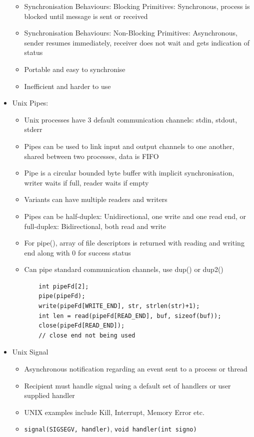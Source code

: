 \documentclass[10pt, landscape]{article}
\begin{document}
\begin{multicols*}{3}
\begin{itemize}
\begin{itemize}
        \item Synchronisation Behaviours: Blocking Primitives: Synchronous, process is blocked until message is sent or received
        \item Synchronisation Behaviours: Non-Blocking Primitives: Asynchronous, sender resumes immediately, receiver does not wait and gets indication of status
        \item Portable and easy to synchronise
        \item Inefficient and harder to use
    \end{itemize}
    \item Unix Pipes:
    \begin{itemize}
        \item Unix processes have 3 default communication channels: stdin, stdout, stderr
        \item Pipes can be used to link input and output channels to one another, shared between two processes, data is FIFO
        \item Pipe is a circular bounded byte buffer with implicit synchronisation, writer waits if full, reader waits if empty
        \item Variants can have multiple readers and writers
        \item Pipes can be half-duplex: Unidirectional, one write and one read end, or full-duplex: Bidirectional, both read and write
        \item For pipe(), array of file descriptors is returned with reading and writing end along with 0 for success status
        \item Can pipe standard communication channels, use dup() or dup2()
        \begin{verbatim}
    int pipeFd[2];
    pipe(pipeFd);
    write(pipeFd[WRITE_END], str, strlen(str)+1);
    int len = read(pipeFd[READ_END], buf, sizeof(buf));
    close(pipeFd[READ_END]);
    // close end not being used
        \end{verbatim}
    \end{itemize}
    \item Unix Signal
    \begin{itemize}
        \item Asynchronous notification regarding an event sent to a process or thread
        \item Recipient must handle signal using a default set of handlers or user supplied handler
        \item UNIX examples include Kill, Interrupt, Memory Error etc.
        \item \verb|signal(SIGSEGV, handler)|, \verb|void handler(int signo)|
    \end{itemize}
\end{itemize}


\end{multicols*}
\end{document}
